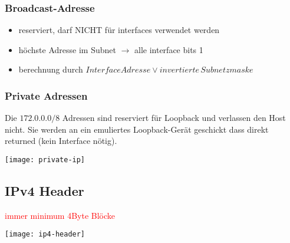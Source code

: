 \subsubsection{Broadcast-Adresse}

\begin{itemize}
    \item reserviert, darf NICHT für interfaces verwendet werden
    \item höchste Adresse im Subnet $\rightarrow$ alle interface bits 1
    \item berechnung durch $Interface Adresse \lor invertierte \, Subnetzmaske$
\end{itemize}

\subsubsection{Private Adressen}

Die $172.0.0.0/8$ Adressen sind reserviert für Loopback und verlassen den Host nicht.
Sie werden an ein emuliertes Loopback-Gerät geschickt dass direkt returned
(kein Interface nötig).
\begin{center}
    \texttt{[image: private-ip]}
\end{center}



\subsection{IPv4 Header}

\textcolor{red}{immer minimum 4Byte Blöcke}

\begin{center}
    \texttt{[image: ip4-header]}
\end{center}

